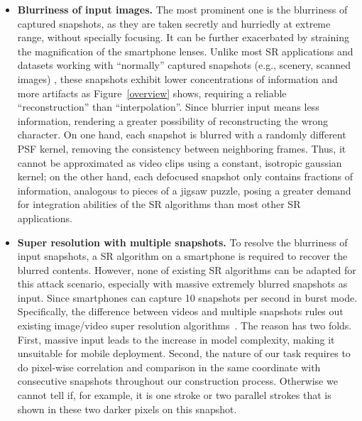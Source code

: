 \begin{itemize}
  \item \textbf{Blurriness of input images.} The most prominent one is the blurriness of captured snapshots, as they are taken secretly and hurriedly at extreme range, without specially focusing. It can be further exacerbated by straining the magnification of the smartphone lenses. Unlike most SR applications and datasets working with ``normally'' captured snapshots (e.g., scenery, scanned images) \cite{nasrollahi2020deep,lyn2020image}, these snapshots exhibit lower concentrations of information and more artifacts as Figure~\ref{overview} shows, requiring a reliable ``reconstruction'' than ``interpolation''. Since blurrier input means less information, rendering a greater possibility of reconstructing the wrong character. 
  On one hand, each snapshot is blurred with a randomly different PSF kernel, removing the consistency between neighboring frames. Thus, it cannot be approximated as video clips using a constant, isotropic gaussian kernel; on the other hand, each defocused snapshot only contains fractions of information, analogous to pieces of a jigsaw puzzle, posing a greater demand for integration abilities of the SR algorithms than most other SR applications.
  \item \textbf{Super resolution with multiple snapshots.} To resolve the blurriness of input snapshots, a SR algorithm on a smartphone is required to recover the blurred contents. However, none of existing SR algorithms can be adapted for this attack scenario, especially with massive extremely blurred snapshots as input. Since smartphones can capture 10 snapshots per second in burst mode. Specifically, the difference between videos and multiple snapshots rules out existing image/video super resolution algorithms~\cite{lucas2019generative,kappeler2016video}. The reason has two folds. First, massive input leads to the increase in model complexity, making it unsuitable for mobile deployment. Second, the nature of our task requires to do pixel-wise correlation and comparison in the same coordinate with consecutive snapshots throughout our construction process. Otherwise we cannot tell if, for example, it is one stroke or two parallel strokes that is shown in these two darker pixels on this snapshot.

\end{itemize}
